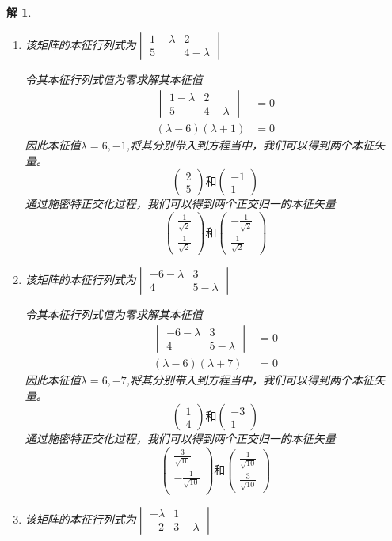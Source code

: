 \documentclass{article}
\newtheorem{solution}{解}
\newcommand{\vmtwo}[4]{
    \begin{vmatrix}
        #1&#2\\
        #3&#4
    \end{vmatrix}
    }
\begin{document}
\begin{solution}
\begin{enumerate}
    \item[a] 该矩阵的本征行列式为$\vmtwo{1-\lambda}{2}{5}{4-\lambda}$
    
    令其本征行列式值为零求解其本征值
    \begin{align*}
        \vmtwo{1-\lambda}{2}{5}{4-\lambda}&=0\\
        (\lambda-6)(\lambda+1)&=0
    \end{align*}
    因此本征值$\lambda=6,-1$,将其分别带入到方程当中，我们可以得到两个本征矢量。
    \[\begin{pmatrix}
        2\\
        5
    \end{pmatrix}和
    \begin{pmatrix}
        -1\\
        1
    \end{pmatrix}\]
    通过施密特正交化过程，我们可以得到两个正交归一的本征矢量
    \[\begin{pmatrix}
        \frac{1}{\sqrt{2}}\\
        \frac{1}{\sqrt{2}}
    \end{pmatrix}和
    \begin{pmatrix}
        -\frac{1}{\sqrt{2}}\\
        \frac{1}{\sqrt{2}}
    \end{pmatrix}\]
    \item[b] 该矩阵的本征行列式为$\vmtwo{-6-\lambda}{3}{4}{5-\lambda}$
    
    令其本征行列式值为零求解其本征值
    \begin{align*}
        \vmtwo{-6-\lambda}{3}{4}{5-\lambda}&=0\\
        (\lambda-6)(\lambda+7)&=0
    \end{align*}
    因此本征值$\lambda=6,-7$,将其分别带入到方程当中，我们可以得到两个本征矢量。
    \[\begin{pmatrix}
        1\\
        4
    \end{pmatrix}和
    \begin{pmatrix}
        -3\\
        1
    \end{pmatrix}\]
    通过施密特正交化过程，我们可以得到两个正交归一的本征矢量
    \[\begin{pmatrix}
        \frac{3}{\sqrt{10}} \\ 
        -\frac{1}{\sqrt{10}} \\
    \end{pmatrix}和
    \begin{pmatrix}
        \frac{1}{\sqrt{10}} \\
        \frac{3}{\sqrt{10}} 
    \end{pmatrix}\]
    \item[c] 该矩阵的本征行列式为$\vmtwo{-\lambda}{1}{-2}{3-\lambda}$
    

\end{enumerate}
\end{solution}
\end{document}
